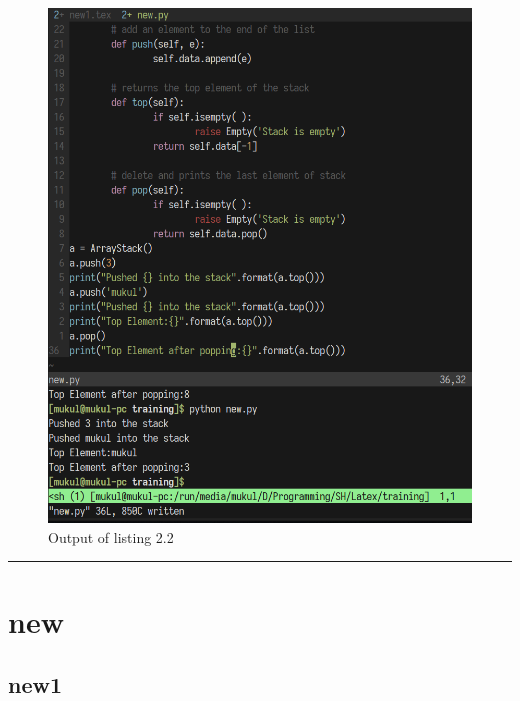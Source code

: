 \documentclass[a4paper,12pt]{report}
\begin{document}
\newpage
\begin{figure}[t]
	\centering
	\includegraphics[scale=0.45]{fig3.png}
	\caption{\textsf{Output of listing 2.2}}
\end{figure}
\rule{15cm}{0.5mm}
\chapter{new}
\section{new1}
\end{document}

